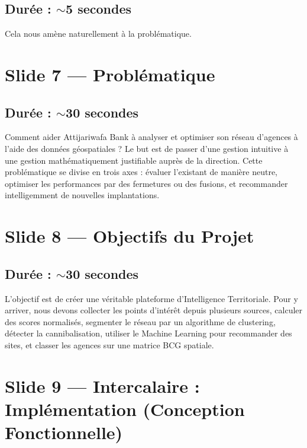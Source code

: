 \documentclass[11pt,a4paper]{article}
\begin{document}
\subsection{Durée : $\sim$5 secondes}
Cela nous amène naturellement à la problématique.

\section{Slide 7 --- Problématique}
\subsection{Durée : $\sim$30 secondes}
Comment aider Attijariwafa Bank à analyser et optimiser son réseau d'agences à l'aide des données géospatiales ? Le but est de passer d'une gestion intuitive à une gestion mathématiquement justifiable auprès de la direction. Cette problématique se divise en trois axes : évaluer l'existant de manière neutre, optimiser les performances par des fermetures ou des fusions, et recommander intelligemment de nouvelles implantations.

\section{Slide 8 --- Objectifs du Projet}
\subsection{Durée : $\sim$30 secondes}
L'objectif est de créer une véritable plateforme d'Intelligence Territoriale. Pour y arriver, nous devons collecter les points d'intérêt depuis plusieurs sources, calculer des scores normalisés, segmenter le réseau par un algorithme de clustering, détecter la cannibalisation, utiliser le Machine Learning pour recommander des sites, et classer les agences sur une matrice BCG spatiale.

\section{Slide 9 --- Intercalaire : Implémentation (Conception Fonctionnelle)}
\end{document}
